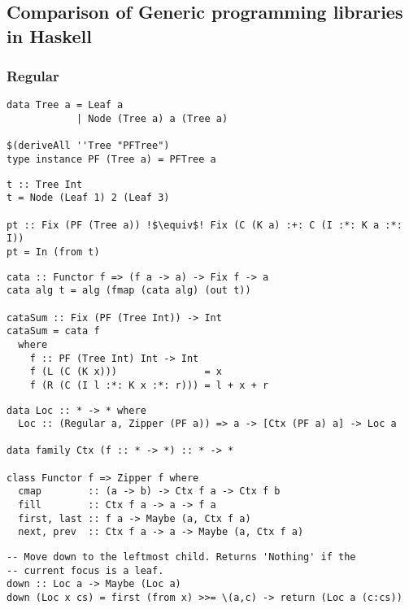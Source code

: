 \subsection{Comparison of Generic programming libraries in Haskell}

\subsubsection{Regular}

\begin{verbatim}
data Tree a = Leaf a
            | Node (Tree a) a (Tree a)

$(deriveAll ''Tree "PFTree")
type instance PF (Tree a) = PFTree a
\end{verbatim}

\begin{verbatim}
t :: Tree Int
t = Node (Leaf 1) 2 (Leaf 3)

pt :: Fix (PF (Tree a)) !$\equiv$! Fix (C (K a) :+: C (I :*: K a :*: I))
pt = In (from t)
\end{verbatim}

\begin{verbatim}
cata :: Functor f => (f a -> a) -> Fix f -> a
cata alg t = alg (fmap (cata alg) (out t))

cataSum :: Fix (PF (Tree Int)) -> Int
cataSum = cata f
  where
    f :: PF (Tree Int) Int -> Int
    f (L (C (K x)))               = x
    f (R (C (I l :*: K x :*: r))) = l + x + r
\end{verbatim}

\begin{verbatim}
data Loc :: * -> * where
  Loc :: (Regular a, Zipper (PF a)) => a -> [Ctx (PF a) a] -> Loc a

data family Ctx (f :: * -> *) :: * -> * 

class Functor f => Zipper f where
  cmap        :: (a -> b) -> Ctx f a -> Ctx f b
  fill        :: Ctx f a -> a -> f a
  first, last :: f a -> Maybe (a, Ctx f a)
  next, prev  :: Ctx f a -> a -> Maybe (a, Ctx f a)
\end{verbatim}

\begin{verbatim}
-- Move down to the leftmost child. Returns 'Nothing' if the
-- current focus is a leaf.
down :: Loc a -> Maybe (Loc a)
down (Loc x cs) = first (from x) >>= \(a,c) -> return (Loc a (c:cs))
\end{verbatim}